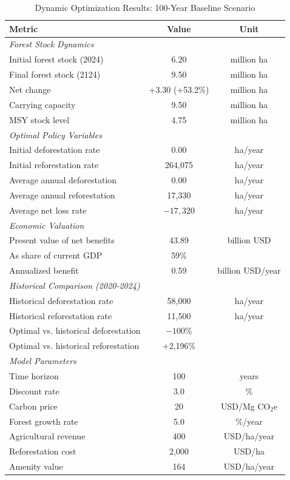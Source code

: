 \begin{table}[htbp]
\centering
\caption{Dynamic Optimization Results: 100-Year Baseline Scenario}
\label{tab:optimization_baseline}
\small
\begin{tabular}{lcc}
\hline\hline
\textbf{Metric} & \textbf{Value} & \textbf{Unit} \\
\hline
\multicolumn{3}{l}{\textit{Forest Stock Dynamics}} \\
\quad Initial forest stock (2024) & 6.20 & million ha \\
\quad Final forest stock (2124) & 9.50 & million ha \\
\quad Net change & +3.30 (+53.2\%) & million ha \\
\quad Carrying capacity & 9.50 & million ha \\
\quad MSY stock level & 4.75 & million ha \\
\hline
\multicolumn{3}{l}{\textit{Optimal Policy Variables}} \\
\quad Initial deforestation rate & 0.00 & ha/year \\
\quad Initial reforestation rate & 264,075 & ha/year \\
\quad Average annual deforestation & 0.00 & ha/year \\
\quad Average annual reforestation & 17,330 & ha/year \\
\quad Average net loss rate & $-17,320$ & ha/year \\
\hline
\multicolumn{3}{l}{\textit{Economic Valuation}} \\
\quad Present value of net benefits & 43.89 & billion USD \\
\quad As share of current GDP & 59\% & \\
\quad Annualized benefit & 0.59 & billion USD/year \\
\hline
\multicolumn{3}{l}{\textit{Historical Comparison (2020-2024)}} \\
\quad Historical deforestation rate & 58,000 & ha/year \\
\quad Historical reforestation rate & 11,500 & ha/year \\
\quad Optimal vs. historical deforestation & $-100\%$ & \\
\quad Optimal vs. historical reforestation & +2,196\% & \\
\hline
\multicolumn{3}{l}{\textit{Model Parameters}} \\
\quad Time horizon & 100 & years \\
\quad Discount rate & 3.0 & \% \\
\quad Carbon price & 20 & USD/Mg CO$_2$e \\
\quad Forest growth rate & 5.0 & \%/year \\
\quad Agricultural revenue & 400 & USD/ha/year \\
\quad Reforestation cost & 2,000 & USD/ha \\
\quad Amenity value & 164 & USD/ha/year \\
\hline\hline
\end{tabular}
\end{table}
